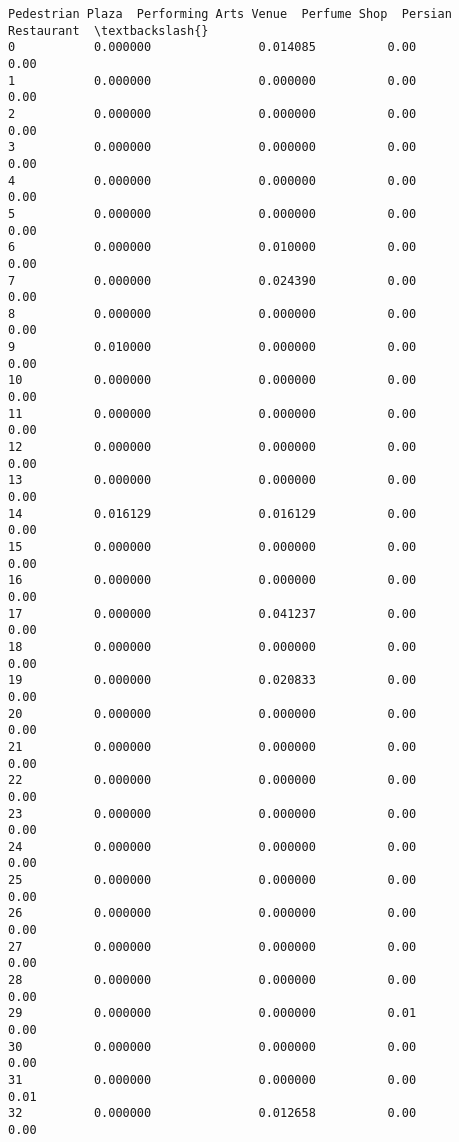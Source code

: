 \documentclass[11pt]{article}
\begin{document}
\begin{tcolorbox}[breakable, size=fbox, boxrule=.5pt, pad at break*=1mm, opacityfill=0]
\begin{Verbatim}[commandchars=\\\{\}]
    Pedestrian Plaza  Performing Arts Venue  Perfume Shop  Persian Restaurant  \textbackslash{}
0           0.000000               0.014085          0.00                0.00
1           0.000000               0.000000          0.00                0.00
2           0.000000               0.000000          0.00                0.00
3           0.000000               0.000000          0.00                0.00
4           0.000000               0.000000          0.00                0.00
5           0.000000               0.000000          0.00                0.00
6           0.000000               0.010000          0.00                0.00
7           0.000000               0.024390          0.00                0.00
8           0.000000               0.000000          0.00                0.00
9           0.010000               0.000000          0.00                0.00
10          0.000000               0.000000          0.00                0.00
11          0.000000               0.000000          0.00                0.00
12          0.000000               0.000000          0.00                0.00
13          0.000000               0.000000          0.00                0.00
14          0.016129               0.016129          0.00                0.00
15          0.000000               0.000000          0.00                0.00
16          0.000000               0.000000          0.00                0.00
17          0.000000               0.041237          0.00                0.00
18          0.000000               0.000000          0.00                0.00
19          0.000000               0.020833          0.00                0.00
20          0.000000               0.000000          0.00                0.00
21          0.000000               0.000000          0.00                0.00
22          0.000000               0.000000          0.00                0.00
23          0.000000               0.000000          0.00                0.00
24          0.000000               0.000000          0.00                0.00
25          0.000000               0.000000          0.00                0.00
26          0.000000               0.000000          0.00                0.00
27          0.000000               0.000000          0.00                0.00
28          0.000000               0.000000          0.00                0.00
29          0.000000               0.000000          0.01                0.00
30          0.000000               0.000000          0.00                0.00
31          0.000000               0.000000          0.00                0.01
32          0.000000               0.012658          0.00                0.00

\end{Verbatim}
\end{tcolorbox}
\end{document}
